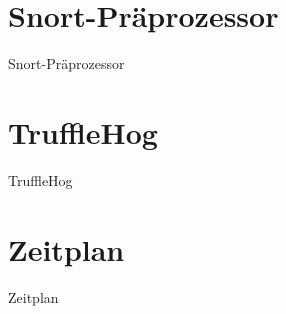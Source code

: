 \documentclass[18pt]{beamer}
\begin{document}
\section{Snort-Präprozessor}
\begin{frame}{Snort-Präprozessor}


\end{frame}


\section{TruffleHog}
\begin{frame}{TruffleHog}



\end{frame}


\section{Zeitplan}
\begin{frame}{Zeitplan}


\end{frame}

\appendix
\beginbackup


\backupend
\end{document}
